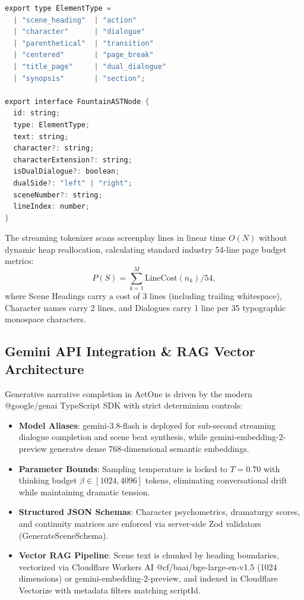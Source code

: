 \documentclass[11pt,a4paper,reqno]{article}
\def\texttt#1{#1}%
\def\mathcal#1{#1}%
\theoremstyle{plain}
\theoremstyle{definition}
\theoremstyle{remark}
\numberwithin{equation}{section}
\begin{document}
\begin{lstlisting}[language=C,morekeywords={export,type,interface,string,boolean,number}]
export type ElementType =
  | "scene_heading"  | "action"
  | "character"      | "dialogue"
  | "parenthetical"  | "transition"
  | "centered"       | "page_break"
  | "title_page"     | "dual_dialogue"
  | "synopsis"       | "section";

export interface FountainASTNode {
  id: string;
  type: ElementType;
  text: string;
  character?: string;
  characterExtension?: string;
  isDualDialogue?: boolean;
  dualSide?: "left" | "right";
  sceneNumber?: string;
  lineIndex: number;
}
\end{lstlisting}

The streaming tokenizer scans screenplay lines in linear time $\mathcal{O}(N)$ without dynamic heap reallocation, calculating standard industry 54-line page budget metrics:
\begin{equation}
\label{eq:page_budget}
\mathcal{P}(S) = \sum_{k=1}^{M} \text{LineCost}(n_k) \Big/ 54,
\end{equation}
where Scene Headings carry a cost of 3 lines (including trailing whitespace), Character names carry 2 lines, and Dialogues carry 1 line per 35 typographic monospace characters.

\subsection{\texorpdfstring{Gemini API Integration \& RAG Vector Architecture}{Gemini API Integration and RAG Vector Architecture}}
Generative narrative completion in ActOne is driven by the modern \texttt{@google/genai} TypeScript SDK with strict determinism controls:
\begin{itemize}[leftmargin=2.0em, itemsep=0.3em]
    \item \textbf{Model Aliases}: \texttt{gemini-3.8-flash} is deployed for sub-second streaming dialogue completion and scene beat synthesis, while \texttt{gemini-embedding-2-preview} generates dense 768-dimensional semantic embeddings.
    \item \textbf{Parameter Bounds}: Sampling temperature is locked to $T = 0.70$ with thinking budget $\beta \in [1024, 4096]$ tokens, eliminating conversational drift while maintaining dramatic tension.
    \item \textbf{Structured JSON Schemas}: Character psychometrics, dramaturgy scores, and continuity matrices are enforced via server-side Zod validators (\texttt{GenerateSceneSchema}).
    \item \textbf{Vector RAG Pipeline}: Scene text is chunked by heading boundaries, vectorized via Cloudflare Workers AI \texttt{@cf/baai/bge-large-en-v1.5} (1024 dimensions) or \texttt{gemini-embedding-2-preview}, and indexed in Cloudflare Vectorize with metadata filters matching \texttt{scriptId}.
\end{itemize}
\end{document}
